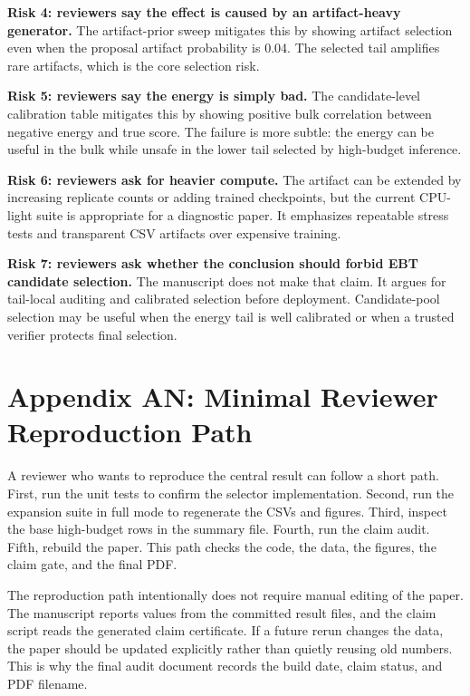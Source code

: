 \documentclass{article}
\begin{document}
\textbf{Risk 4: reviewers say the effect is caused by an artifact-heavy
generator.} The artifact-prior sweep mitigates this by showing artifact
selection even when the proposal artifact probability is 0.04. The selected
tail amplifies rare artifacts, which is the core selection risk.

\textbf{Risk 5: reviewers say the energy is simply bad.} The candidate-level
calibration table mitigates this by showing positive bulk correlation between
negative energy and true score. The failure is more subtle: the energy can be
useful in the bulk while unsafe in the lower tail selected by high-budget
inference.

\textbf{Risk 6: reviewers ask for heavier compute.} The artifact can be
extended by increasing replicate counts or adding trained checkpoints, but the
current CPU-light suite is appropriate for a diagnostic paper. It emphasizes
repeatable stress tests and transparent CSV artifacts over expensive training.

\textbf{Risk 7: reviewers ask whether the conclusion should forbid EBT
candidate selection.} The manuscript does not make that claim. It argues for
tail-local auditing and calibrated selection before deployment. Candidate-pool
selection may be useful when the energy tail is well calibrated or when a
trusted verifier protects final selection.

\section*{Appendix AN: Minimal Reviewer Reproduction Path}

A reviewer who wants to reproduce the central result can follow a short path.
First, run the unit tests to confirm the selector implementation. Second, run
the expansion suite in full mode to regenerate the CSVs and figures. Third,
inspect the base high-budget rows in the summary file. Fourth, run the claim
audit. Fifth, rebuild the paper. This path checks the code, the data, the
figures, the claim gate, and the final PDF.

The reproduction path intentionally does not require manual editing of the
paper. The manuscript reports values from the committed result files, and the
claim script reads the generated claim certificate. If a future rerun changes
the data, the paper should be updated explicitly rather than quietly reusing
old numbers. This is why the final audit document records the build date,
claim status, and PDF filename.
\end{document}
